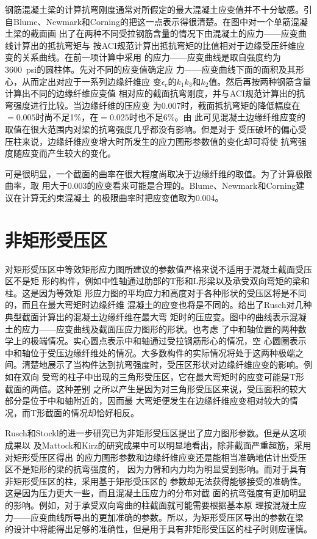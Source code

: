 \documentclass[12pt,a4paper]{book}
\begin{document}
钢筋混凝土梁的计算抗弯刚度通常对所假定的最大混凝土应变值并不十分敏感。引
自Blume、Newmark和Corning的把这一点表示得很清楚。在图中对一个单筋混凝土梁的截面画
出了在两种不同受拉钢筋含量的情况下由混凝土的应力——应变曲线计算出的抵抗弯矩与
按ACI规范计算出抵抗弯矩的比值相对于边缘受压纤维应变的关系曲线。在前一项计算中采用
的应力——应变曲线是取自强度约为\SI{3600}{psi}的圆柱体。先对不同的应变值确定应
力——应变曲线下面的面积及其形心，从而定出对应于一系列边缘纤维应
变$\epsilon_c$的$k_1k_3$和$k_2$值。然后再按两种钢筋含量计算出不同的边缘纤维应变值
相对应的截面抗弯刚度，并与ACI规范计算出的抗弯强度进行比较。当边缘纤维的压应变
为0.007时，截面抵抗弯矩的降低幅度在$=0.005$时尚不足1\%，在$=0.025$时也不足6\%。由
此可见混凝土边缘纤维应变的取值在很大范围内对梁的抗弯强度几乎都没有影响。但是对于
受压破坏的偏心受压柱来说，边缘纤维应变增大时所发生的应力图形参数值的变化却可将使
抗弯强度随应变而产生较大的变化。

可是很明显，一个截面的曲率在很大程度尚取决于边缘纤维的取值。为了计算极限曲率，取
用大于0.003的应变看来可能是合理的。Blume、Newmark和Corning建议在计算无约束混凝土
的极限曲率时把应变值取为0.004。

\section{非矩形受压区}

对矩形受压区中等效矩形应力图所建议的参数值严格来说不适用于混凝土截面受压区不是矩
形的构件，例如中性轴通过肋部的T形和L形梁以及承受双向弯矩的梁和柱。这是因为等效矩
形应力图的平均应力和高度对于各种形状的受压区将是不同的，而且在最大弯矩时边缘纤维
混凝土的应变也将是不同的。给出了Rusch对几种典型截面计算出的混凝土边缘纤维在最大弯
矩时的压应变。图中的曲线表示混凝土的应力——应变曲线及截面压应力图形的形状。也考虑
了中和轴位置的两种数学上的极端情况。实心圆点表示中和轴通过受拉钢筋形心的情况，空
心圆圈表示中和轴位于受压边缘纤维处的情况。大多数构件的实际情况将处于这两种极端之
间。清楚地展示了当构件达到抗弯强度时，受压区形状对边缘纤维应变的影响。例如在双向
受弯的柱子中出现的三角形受压区，它在最大弯矩时的应变可能是T形截面的两倍。这种差别
之所以产生是因为对三角形受压区来说，受压面积的较大部分是位于中和轴附近的，因而最
大弯矩便发生在边缘纤维应变相对较大的情况，而T形截面的情况却恰好相反。

Rusch和Stockl的进一步研究已为非矩形受压区提出了应力图形参数。但是从这项成果以
及Mattock和Kirz的研究成果中可以明显地看出，除非截面严重超筋，采用对矩形受压区得出
的应力图形参数和边缘纤维应变还是能相当准确地估计出受压区不是矩形的梁的抗弯强度的，
因为力臂和内力均为明显受到影响。而对于具有非矩形受压区的柱，采用基于矩形受压区的
参数却无法获得能够接受的准确性。这是因为压力更大一些，而且混凝土压应力的分布对截
面的抗弯强度有更加明显的影响。例如，对于承受双向弯曲的柱截面就可能需要根据基本原
理按混凝土应力——应变曲线所导出的更加准确的参数。所以，为矩形受压区导出的参数在梁
的设计中将能得出足够的准确性，但是用于具有非矩形受压区的柱子时则应谨慎。
\end{document}
